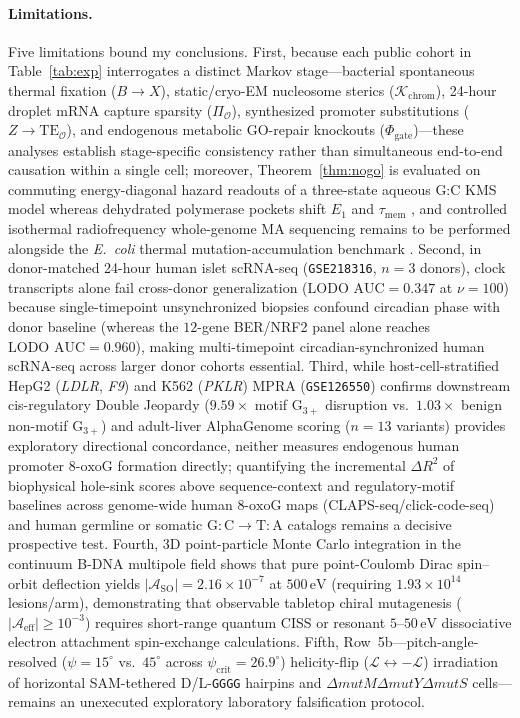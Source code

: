 \documentclass[10pt,letterpaper]{article}
\theoremstyle{plain}
\theoremstyle{definition}
\newcommand{\oxog}{\text{8-oxoG}}
\begin{document}
\paragraph{Limitations.} Five limitations bound my conclusions. First, because each public cohort in Table~\ref{tab:exp} interrogates a distinct Markov stage---bacterial spontaneous thermal fixation ($B \to X$), static/cryo-EM nucleosome sterics ($\mathcal{K}_{\mathrm{chrom}}$), 24-hour droplet mRNA capture sparsity ($\Pi_{\mathcal{O}}$), synthesized promoter substitutions ($Z \to \mathrm{TE}_{\mathcal{O}}$), and endogenous metabolic GO-repair knockouts ($\Phi_{\mathrm{gate}}$)---these analyses establish stage-specific consistency rather than simultaneous end-to-end causation within a single cell; moreover, Theorem~\ref{thm:nogo} is evaluated on commuting energy-diagonal hazard readouts of a three-state aqueous G:C KMS model whereas dehydrated polymerase pockets shift $E_1$ and $\tau_{\mathrm{mem}}$ \cite{winokan2023scirep}, and controlled isothermal radiofrequency whole-genome MA sequencing remains to be performed alongside the \emph{E.\ coli} thermal mutation-accumulation benchmark \cite{chu2018bmcevol}. Second, in donor-matched 24-hour human islet scRNA-seq (\texttt{GSE218316}, $n = 3$ donors), clock transcripts alone fail cross-donor generalization ($\text{LODO AUC} = 0.347$ at $\nu = 100$) because single-timepoint unsynchronized biopsies confound circadian phase with donor baseline (whereas the $12$-gene BER/NRF2 panel alone reaches $\text{LODO AUC} = 0.960$), making multi-timepoint circadian-synchronized human scRNA-seq across larger donor cohorts essential. Third, while host-cell-stratified HepG2 (\emph{LDLR}, \emph{F9}) and K562 (\emph{PKLR}) MPRA (\texttt{GSE126550}) confirms downstream cis-regulatory Double Jeopardy ($9.59\times$ motif $\mathrm{G}_{3+}$ disruption vs.\ $1.03\times$ benign non-motif $\mathrm{G}_{3+}$) and adult-liver AlphaGenome scoring ($n = 13$ variants) provides exploratory directional concordance, neither measures endogenous human promoter $\oxog$ formation directly; quantifying the incremental $\Delta R^2$ of biophysical hole-sink scores above sequence-context and regulatory-motif baselines across genome-wide human $\oxog$ maps (CLAPS-seq/click-code-seq) and human germline or somatic $\mathrm{G{:}C \to T{:}A}$ catalogs remains a decisive prospective test. Fourth, 3D point-particle Monte Carlo integration in the continuum B-DNA multipole field shows that pure point-Coulomb Dirac spin--orbit deflection yields $|\mathcal{A}_{\mathrm{SO}}| = 2.16 \times 10^{-7}$ at $500\,\mathrm{eV}$ (requiring $1.93 \times 10^{14}$ lesions/arm), demonstrating that observable tabletop chiral mutagenesis ($|\mathcal{A}_{\mathrm{eff}}| \ge 10^{-3}$) requires short-range quantum CISS or resonant $5$--$50\,\mathrm{eV}$ dissociative electron attachment spin-exchange calculations. Fifth, Row~5b---pitch-angle-resolved ($\psi = 15^\circ$ vs.\ $45^\circ$ across $\psi_{\mathrm{crit}} = 26.9^\circ$) helicity-flip ($\mathcal{L} \leftrightarrow -\mathcal{L}$) irradiation of horizontal SAM-tethered D/L-\texttt{GGGG} hairpins and $\Delta\textit{mutM}\Delta\textit{mutY}\Delta\textit{mutS}$ cells---remains an unexecuted exploratory laboratory falsification protocol.
\end{document}
